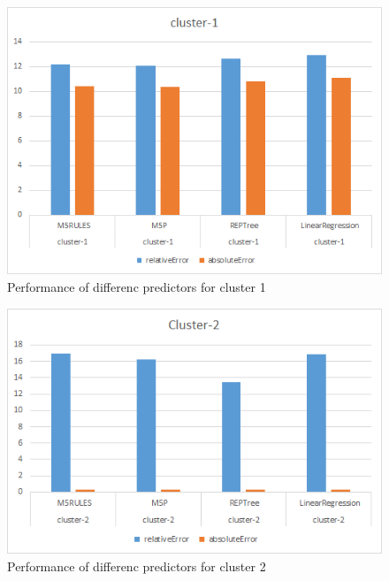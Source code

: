 \begin{figure}[h!]
  \includegraphics[width=\linewidth]{cluster-1-predictors.png}
  \caption{Performance of differenc predictors for cluster 1}
  \label{fig:cluster-1-predictors}
\end{figure}


\begin{figure}[h!]
  \includegraphics[width=\linewidth]{cluster-2-predictors.png}
  \caption{Performance of differenc predictors for cluster 2}
  \label{fig:cluster-2-predictors}
\end{figure}


